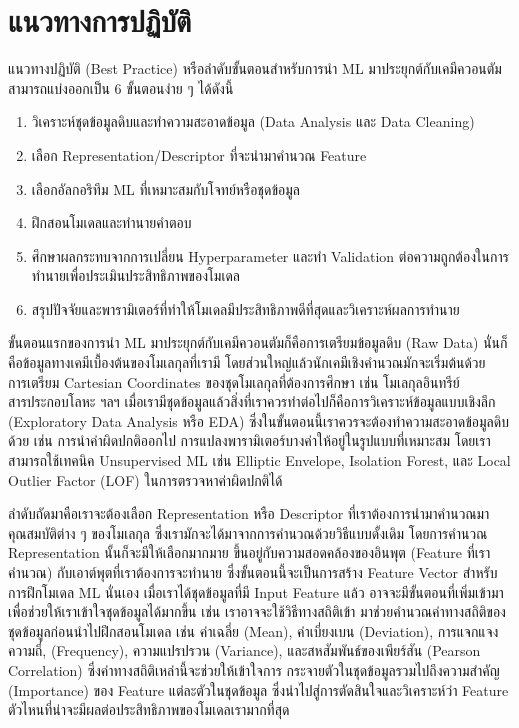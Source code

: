 \section{แนวทางการปฏิบัติ}
\label{sec:pred_best_prac}

แนวทางปฏิบัติ (Best Practice) หรือลำดับขั้นตอนสำหรับการนำ ML มาประยุกต์กับเคมีควอนตัมสามารถแบ่งออกเป็น 6 ขั้นตอนง่าย ๆ ได้ดังนี้

\begin{enumerate}
    \item วิเคราะห์ชุดข้อมูลดิบและทำความสะอาดข้อมูล (Data Analysis และ Data Cleaning)
    
    \item เลือก Representation/Descriptor ที่จะนำมาคำนวณ Feature 
    
    \item เลือกอัลกอริทึม ML ที่เหมาะสมกับโจทย์หรือชุดข้อมูล
    
    \item ฝึกสอนโมเดลและทำนายคำตอบ
    
    \item ศึกษาผลกระทบจากการเปลี่ยน Hyperparameter และทำ Validation ต่อความถูกต้องในการทำนายเพื่อประเมินประสิทธิภาพของโมเดล
    
    \item สรุปปัจจัยและพารามิเตอร์ที่ทำให้โมเดลมีประสิทธิภาพดีที่สุดและวิเคราะห์ผลการทำนาย
\end{enumerate}

ขั้นตอนแรกของการนำ ML มาประยุกต์กับเคมีควอนตัมก็คือการเตรียมข้อมูลดิบ (Raw Data) นั่นก็คือข้อมูลทางเคมีเบื้องต้นของโมเลกุลที่เรามี 
โดยส่วนใหญ่แล้วนักเคมีเชิงคำนวณมักจะเริ่มต้นด้วยการเตรียม Cartesian Coordinates ของชุดโมเลกุลที่ต้องการศึกษา เช่น โมเลกุลอินทรีย์
สารประกอบโลหะ ฯลฯ เมื่อเรามีชุดข้อมูลแล้วสิ่งที่เราควรทำต่อไปก็คือการวิเคราะห์ข้อมูลแบบเชิงลึก (Exploratory Data Analysis หรือ EDA) 
ซึ่งในขั้นตอนนี้เราควรจะต้องทำความสะอาดข้อมูลดิบด้วย เช่น การนำค่าผิดปกติออกไป การแปลงพารามิเตอร์บางค่าให้อยู่ในรูปแบบที่เหมาะสม 
โดยเราสามารถใช้เทคนิค Unsupervised ML เช่น Elliptic Envelope, Isolation Forest, และ Local Outlier Factor (LOF)
ในการตรวจหาค่าผิดปกติได้

ลำดับถัดมาคือเราจะต้องเลือก Representation หรือ Descriptor ที่เราต้องการนำมาคำนวณมาคุณสมบัติต่าง ๆ ของโมเลกุล 
ซึ่งเรามักจะได้มาจากการคำนวณด้วยวิธีแบบดั้งเดิม โดยการคำนวณ Representation นั้นก็จะมีให้เลือกมากมาย ขึ้นอยู่กับความสอดคล้องของอินพุต 
(Feature ที่เราคำนวณ) กับเอาต์พุตที่เราต้องการจะทำนาย ซึ่งขั้นตอนนี้จะเป็นการสร้าง Feature Vector สำหรับการฝึกโมเดล ML นั่นเอง 
เมื่อเราได้ชุดข้อมูลที่มี Input Feature แล้ว อาจจะมีขั้นตอนที่เพิ่มเข้ามาเพื่อช่วยให้เราเข้าใจชุดข้อมูลได้มากขึ้น เช่น เราอาจจะใช้วิธีทางสถิติเข้า%
มาช่วยคำนวณค่าทางสถิติของชุดข้อมูลก่อนนำไปฝึกสอนโมเดล เช่น ค่าเฉลี่ย (Mean), ค่าเบี่ยงเบน (Deviation), การแจกแจงความถี่, 
(Frequency), ความแปรปรวน (Variance), และสหสัมพันธ์ของเพียร์สัน (Pearson Correlation) ซึ่งค่าทางสถิติเหล่านี้จะช่วยให้เข้าใจการ%
กระจายตัวในชุดข้อมูลรวมไปถึงความสำคัญ (Importance) ของ Feature แต่ละตัวในชุดข้อมูล ซึ่งนำไปสู่การตัดสินใจและวิเคราะห์ว่า Feature 
ตัวไหนที่น่าจะมีผลต่อประสิทธิภาพของโมเดลเรามากที่สุด 


